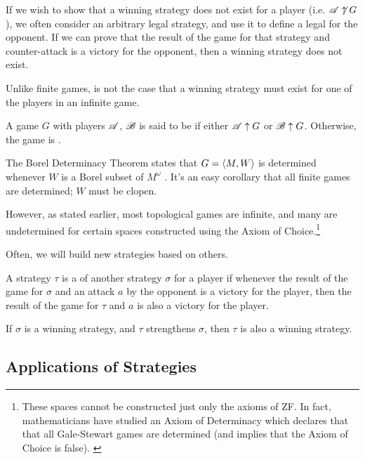 If we wish to show that a winning strategy does not exist for a player
(i.e. $\mathscr{A}\not\uparrow G$), we
often consider an arbitrary legal strategy, and use it to define a legal
 for the opponent. If we can prove that the result of
the game for that strategy and counter-attack is a victory for the opponent,
then a winning strategy does not exist.

Unlike finite games, is not the case that a winning strategy must exist for
one of the players in an infinite game.

\begin{defn}
  A game $G$ with players $\mathscr{A}$, $\mathscr{B}$ is said to be 
  if either $\mathscr{A} \uparrow G$ or $\mathscr{B} \uparrow G$.
  Otherwise, the game is .
\end{defn}

The Borel Determinacy Theorem states that $G=\langle M,W\rangle$ is determined whenever
$W$ is a Borel subset of $M^\omega$ \cite{MR0403976}. It's an easy corollary that
all finite games are determined; $W$ must be clopen.

However, as stated earlier, most topological games are infinite,
and many are undetermined for certain spaces constructed using the Axiom of
Choice.\footnote{
  These spaces cannot be constructed just only the axioms of ZF. In fact,
  mathematicians have studied an Axiom of Determinacy which declares that
  that all Gale-Stewart games are determined (and implies that the Axiom
  of Choice is false). \cite{MR0140430}
}

Often, we will build new strategies based on others.

\begin{defn}
  A strategy $\tau$ is a  of another strategy $\sigma$
  for a player if whenever the result of the game for $\sigma$ and an attack
  $a$ by the opponent is a victory for the player, then the result of the game
  for $\tau$ and $a$ is also a victory for the player.
\end{defn}

\begin{prop}
  If $\sigma$ is a winning strategy, and $\tau$ strengthens $\sigma$,
  then $\tau$ is also a winning strategy.
\end{prop}

\subsection{Applications of Strategies}

